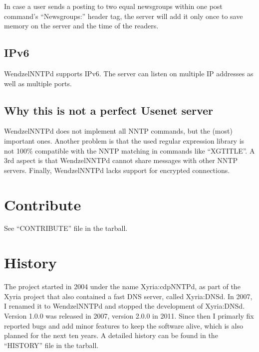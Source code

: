 In case a user sends a posting to two equal newsgroups within one post command's ``Newsgroups:'' header tag, the server will add it only once to save memory on the server and the time of the readers.

\subsection{IPv6}

WendzelNNTPd supports IPv6. The server can listen on multiple IP addresses as well as multiple ports.

\subsection{Why this is not a perfect Usenet server}

WendzelNNTPd does not implement all NNTP commands, but the (most) important ones. Another problem is that the used regular expression library is not 100\% compatible with the NNTP matching in commands like ``XGTITLE''. A 3rd aspect is that WendzelNNTPd cannot share messages with other NNTP servers. Finally, WendzelNNTPd lacks support for encrypted connections.

\section{Contribute}

See ``CONTRIBUTE'' file in the tarball.

\section{History}

The project started in 2004 under the name Xyria:cdpNNTPd, as part of the Xyria project that also contained a fast DNS server, called Xyria:DNSd. In 2007, I renamed it to WendzelNNTPd and stopped the development of Xyria:DNSd. Version 1.0.0 was released in 2007, version 2.0.0 in 2011. Since then I primarly fix reported bugs and add minor features to keep the software alive, which is also planned for the next ten years. A detailed history can be found in the ``HISTORY'' file in the tarball.





